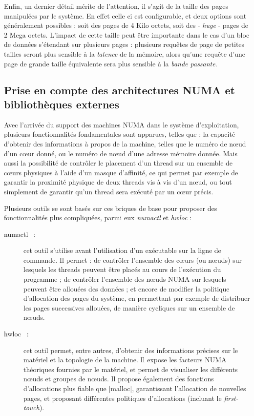 Enfin, un dernier détail mérite de l'attention, il s'agit de la taille des pages manipulées par le système.
En effet celle ci est configurable, et deux options sont généralement possibles : soit des pages de 4 Kilo octets, soit des - \emph{huge} - pages de 2 Mega octets.
L'impact de cette taille peut être importante dans le cas d'un bloc de données s'étendant sur plusieurs pages : plusieurs requêtes de page de petites tailles seront plus sensible à la \emph{latence} de la mémoire, alors qu'une requête d'une page de grande taille équivalente sera plus sensible à la \emph{bande passante}.

\subsection{Prise en compte des architectures NUMA et bibliothèques externes}

Avec l'arrivée du support des machines NUMA dans le système d'exploitation, plusieurs fonctionnalités fondamentales sont apparues, telles que : la capacité d'obtenir des informations à propos de la machine, telles que le numéro de nœud d'un cœur donné, ou le numéro de nœud d'une adresse mémoire donnée.
Mais aussi la possibilité de contrôler le placement d'un thread sur un ensemble de cœurs physiques à l'aide d'un masque d'affinité, ce qui permet par exemple de garantir la proximité physique de deux threads vis à vis d'un nœud, ou tout simplement de garantir qu'un thread sera exécuté par un cœur précis.

Plusieurs outils se sont basés sur ces briques de base pour proposer des fonctionnalités plus compliquées, parmi eux \emph{numactl} et \emph{hwloc} :

\begin{description}
  \item [numactl~\cite{numactl} :] cet outil s'utilise avant l'utilisation d'un exécutable sur la ligne de commande. Il permet : de contrôler l'ensemble des cœurs (ou nœuds) sur lesquels les threads peuvent être placés au cours de l'exécution du programme ;
    de contrôler l'ensemble des nœuds NUMA sur lesquels peuvent être allouées des données ;
    et encore de modifier la politique d'allocation des pages du système, en permettant par exemple de distribuer les pages successives allouées, de manière cycliques sur un ensemble de nœuds.
  \item [hwloc~\cite{Broquedis2010} :] cet outil permet, entre autres, d'obtenir des informations précises sur le matériel et la topologie de la machine. Il expose les facteurs NUMA théoriques fournies par le matériel, et permet de visualiser les différents nœuds et groupes de nœuds.
  Il propose également des fonctions d'allocations plus fiable que |malloc|, garantissant l'allocation de nouvelles pages, et proposant différentes politiques d'allocations (incluant le \emph{first-touch}).
\end{description}



